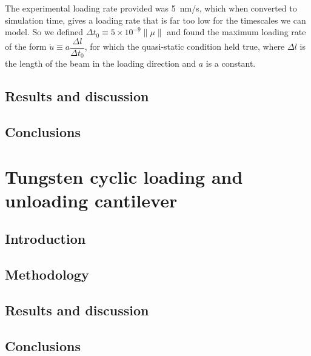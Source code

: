 The experimental loading rate provided was \SI{5}{\nano\metre/\second}, which when converted to simulation time, gives a loading rate that is far too low for the timescales we can model. So we defined $\Delta t_0 \equiv 5\times 10^{-9} \lVert\mu\rVert$ and found the maximum loading rate of the form $\dot{u} \equiv a \dfrac{\Delta l}{\Delta t_0}$, for which the quasi-static condition held true, where $\Delta l$ is the length of the beam in the loading direction and $a$ is a constant.






\subsection{Results and discussion}
\subsection{Conclusions}

\section{Tungsten cyclic loading and unloading cantilever}\label{s:tungstenCyclic}
\subsection{Introduction}
\subsection{Methodology}
\subsection{Results and discussion}
\subsection{Conclusions}



